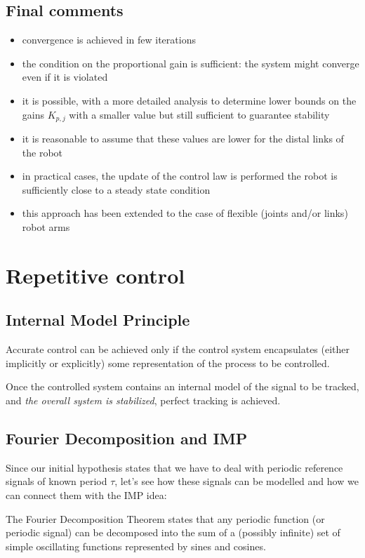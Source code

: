 \documentclass{book}
\begin{document}
\subsection{Final comments}
\begin{itemize}
    \item convergence is achieved in few iterations 
    \item  the condition on the proportional gain is sufficient: the system might converge even if it is violated 
    \item it is possible, with a more detailed analysis to determine lower bounds on the gains $K_{p,j}$ with a smaller value but still sufficient to guarantee stability 
    \item it is reasonable to assume that these values are lower for the distal links of the robot 
    \item in practical cases, the update of the control law is performed the robot is sufficiently close to a steady state condition 
    \item this approach has been extended to the case of flexible (joints and/or links) robot arms
\end{itemize}


\section{Repetitive control}
\subsection{Internal Model Principle}
Accurate control can be achieved only if the control system encapsulates (either implicitly or explicitly) some representation of the process to be controlled. 

Once the controlled system contains an internal model of the signal to be tracked, and \emph{the overall system is stabilized}, perfect tracking is achieved. 
\subsection{Fourier Decomposition and IMP}
Since our initial hypothesis states that we have to deal with periodic reference signals of known period $\tau$, let's see how these signals can be modelled and how we can connect them with the IMP idea: 

The Fourier Decomposition Theorem states that any periodic function (or periodic signal) can be decomposed into the sum of a (possibly infinite) set of simple oscillating functions represented by sines and cosines. 
\end{document}
